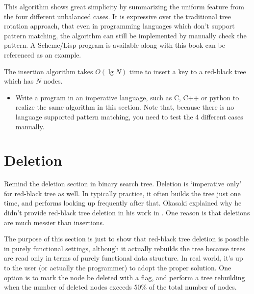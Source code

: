 \documentclass{article}
\begin{document}
This algorithm shows great simplicity by summarizing the uniform feature
from the four different unbalanced cases. It is expressive over
the traditional tree rotation approach, that even in programming languages
which don't support pattern matching, the algorithm can still be
implemented by manually check the pattern. A Scheme/Lisp program
is available along with this book can be referenced as an example.

The insertion algorithm takes $O(\lg N)$ time to insert a key to
a red-black tree which has $N$ nodes.

\begin{Exercise}

\begin{itemize}
\item Write a program in an imperative language, such as
C, C++ or python to realize the same algorithm in this
section. Note that, because there is no language supported
pattern matching, you need to test the 4 different cases
manually.
\end{itemize}

\end{Exercise}


\section{Deletion}

Remind the deletion section in binary search tree. Deletion is
`imperative only' for red-black tree as well. In typically
practice, it often builds the tree just one time, and
performs looking up frequently after that. Okasaki explained
why he didn't provide red-black tree deletion in his work
in \cite{okasaki-blog}. One reason is that deletions are
much messier than insertions.

The purpose of this section is just to show that red-black
tree deletion is possible in purely functional settings,
although it actually rebuilds the tree because trees are
read only in terms of purely functional data structure.
In real world, it's up to the user (or actually the
programmer) to adopt the proper solution. One option is to mark
the node be deleted with a flag, and perform a tree rebuilding
when the number of deleted nodes exceeds 50\% of the total number
of nodes.
\end{document}
